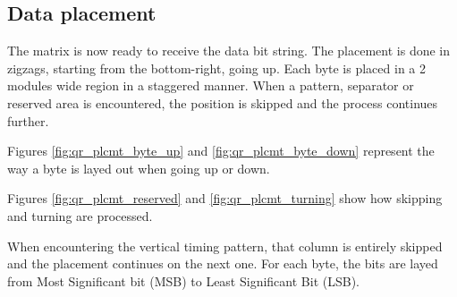 \subsection{Data placement}
\label{ssec:qr_placement}

The matrix is now ready to receive the data bit string. The placement is done in zigzags, starting from the bottom-right, going up. Each byte is placed in a 2 modules wide region in a staggered manner. When a pattern, separator or reserved area is encountered, the position is skipped and the process continues further.

Figures \ref{fig:qr_plcmt_byte_up} and \ref{fig:qr_plcmt_byte_down} represent the way a byte is layed out when going up or down.

Figures \ref{fig:qr_plcmt_reserved} and \ref{fig:qr_plcmt_turning} show how skipping and turning are processed.

When encountering the vertical timing pattern, that column is entirely skipped and the placement continues on the next one. For each byte, the bits are layed from Most Significant bit (MSB) to Least Significant Bit (LSB).

